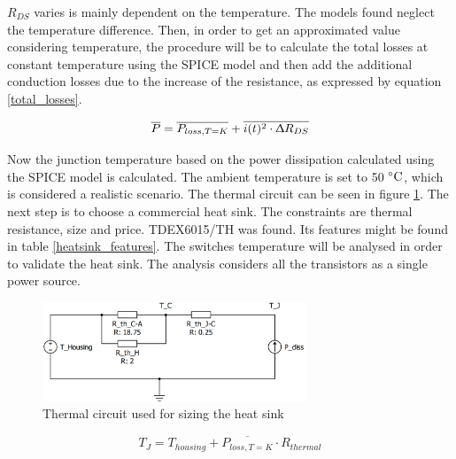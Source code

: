 $R_{DS}$ varies  is mainly dependent on the temperature. The models found neglect the temperature difference. Then, in order to get an approximated value considering temperature, the procedure will be to calculate the total losses at constant temperature using the SPICE model and then add the additional conduction losses due to the increase of the resistance, as expressed by equation \ref{total_losses}.



\begin{equation} \label{total_losses}
\overline{P} = \overline{P_{loss, T = K}} + \overline{i(t)^2 \cdot \Updelta R_{DS}}
\end{equation}

Now the junction temperature based on the power dissipation calculated using the SPICE model is calculated. The ambient temperature is set to 50 $\decC$, which is considered a realistic scenario. The thermal circuit can be seen in figure \ref{thermal_circuit}. The next step is to choose a commercial heat sink. The constraints are thermal resistance, size and price. TDEX6015/TH was found. Its features might be found in table \ref{heatsink_features}. The switches temperature will be analysed in order to validate the heat sink. The analysis considers all the transistors as a single power source.

\begin{figure}[H]
	\begin{center}
		\includegraphics[width=0.7\textwidth]{../Pictures/thermal_circuit.png}
		\caption{Thermal circuit used for sizing the heat sink}
		\label{thermal_circuit}
	\end{center}	
\end{figure}

\begin{equation} \label{switch_temperature}
T_{J} = T_{housing} + \overline{P_{loss, T = K}} \cdot  R_{thermal}
\end{equation}

